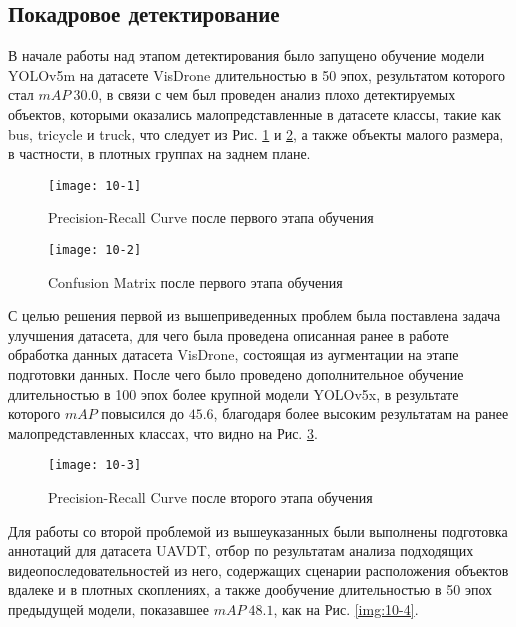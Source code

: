 \subsection{Покадровое детектирование}

В начале работы над этапом детектирования было запущено обучение модели YOLOv5m на датасете VisDrone длительностью в 50 эпох, результатом которого стал $mAP \ 30.0$, в связи с чем был проведен анализ плохо детектируемых объектов, которыми оказались малопредставленные в датасете классы, такие как bus, tricycle и truck, что следует из Рис. \ref{img:10-1} и \ref{img:10-2}, а также объекты малого размера, в частности, в плотных группах на заднем плане.

\vspace{0.5cm}

\begin{figure}[ht]
    \centering
    \texttt{[image: 10-1]}
    \caption{Precision-Recall Curve после первого этапа обучения}
    \label{img:10-1}
\end{figure}

\begin{figure}[ht]
    \centering
    \texttt{[image: 10-2]}
    \caption{Confusion Matrix после первого этапа обучения}
    \label{img:10-2}
\end{figure}

С целью решения первой из вышеприведенных проблем была поставлена задача улучшения датасета, для чего была проведена описанная ранее в работе обработка данных датасета VisDrone, состоящая из аугментации на этапе подготовки данных. После чего было проведено дополнительное обучение длительностью в 100 эпох более крупной модели YOLOv5x, в результате которого $mAP$ повысился до $45.6$, благодаря более высоким результатам на ранее малопредставленных классах, что видно на Рис. \ref{img:10-3}.

\begin{figure}[ht]
    \centering
    \texttt{[image: 10-3]}
    \caption{Precision-Recall Curve после второго этапа обучения}
    \label{img:10-3}
\end{figure}

Для работы со второй проблемой из вышеуказанных были выполнены подготовка аннотаций для датасета UAVDT, отбор по результатам анализа подходящих видеопоследовательностей из него, содержащих сценарии расположения объектов вдалеке и в плотных скоплениях, а также дообучение длительностью в 50 эпох предыдущей модели, показавшее $mAP \ 48.1$, как на Рис. \ref{img:10-4}.

